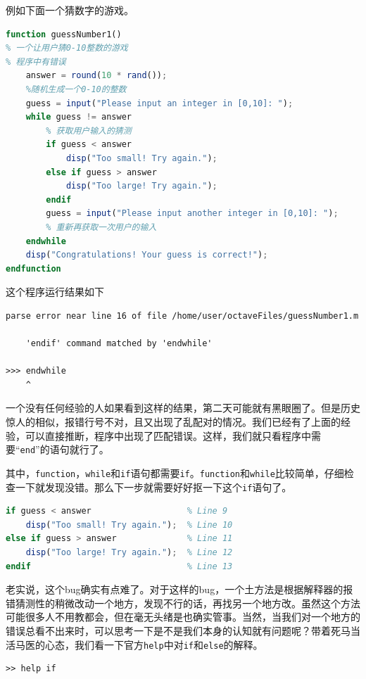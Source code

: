 \documentclass[12pt]{article}
\begin{document}
\begin{spacing}{1.4}
例如下面一个猜数字的游戏。

\begin{lstlisting}[language=octave]
function guessNumber1()
% 一个让用户猜0-10整数的游戏
% 程序中有错误
    answer = round(10 * rand());
    %随机生成一个0-10的整数
    guess = input("Please input an integer in [0,10]: ");
    while guess != answer
        % 获取用户输入的猜测
        if guess < answer
            disp("Too small! Try again.");
        else if guess > answer
            disp("Too large! Try again.");
        endif
        guess = input("Please input another integer in [0,10]: ");
        % 重新再获取一次用户的输入
    endwhile
    disp("Congratulations! Your guess is correct!");
endfunction
\end{lstlisting}

这个程序运行结果如下

\begin{lstlisting}
parse error near line 16 of file /home/user/octaveFiles/guessNumber1.m

    'endif' command matched by 'endwhile'
  
>>> endwhile
    ^
\end{lstlisting}

一个没有任何经验的人如果看到这样的结果，第二天可能就有黑眼圈了。但是历史惊人的相似，报错行号不对，且又出现了乱配对的情况。我们已经有了上面的经验，可以直接推断，程序中出现了匹配错误。这样，我们就只看程序中需要“\texttt{end}”的语句就行了。

其中，\texttt{function}，\texttt{while}和\texttt{if}语句都需要\texttt{if}。\texttt{function}和\texttt{while}比较简单，仔细检查一下就发现没错。那么下一步就需要好好抠一下这个\texttt{if}语句了。

\begin{lstlisting}[language=octave]
if guess < answer                   % Line 9
    disp("Too small! Try again.");  % Line 10
else if guess > answer              % Line 11
    disp("Too large! Try again.");  % Line 12
endif                               % Line 13
\end{lstlisting}

老实说，这个bug确实有点难了。对于这样的bug，一个土方法是根据解释器的报错猜测性的稍微改动一个地方，发现不行的话，再找另一个地方改。虽然这个方法可能很多人不用教都会，但在毫无头绪是也确实管事。当然，当我们对一个地方的错误总看不出来时，可以思考一下是不是我们本身的认知就有问题呢？带着死马当活马医的心态，我们看一下官方\texttt{help}中对\texttt{if}和\texttt{else}的解释。

\begin{lstlisting}
>> help if


\end{lstlisting}
\end{spacing}
\end{document}

